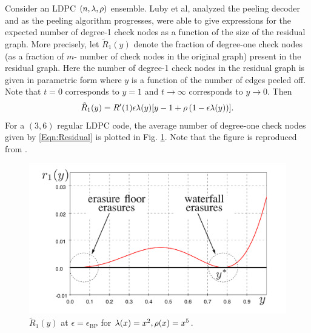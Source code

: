 Consider an LDPC  $(n,\lambda,\rho)$ ensemble. Luby et al, analyzed the peeling decoder and as  the peeling algorithm progresses, were able to give expressions for the expected number of degree-1 check nodes as a function of the size of the residual graph. More precisely, let $\tilde{R}_{1}(y)$ denote the fraction of degree-one check nodes (as a fraction of $m$- number of check nodes in the original graph) present in the residual graph. Here the number of degree-1 check nodes in the residual graph is given in parametric form where $y$ is a function of the number of edges peeled off. Note that $t=0$ corresponds to $y=1$ and $t\rightarrow \infty$ corresponds to $y\rightarrow 0$. Then
\begin{align}
\tilde{R}_{1}(y)=R'(1)\epsilon\lambda(y)[y-1+\rho\left(1-\epsilon\lambda(y)\right) ].
\label{Eqn:Residual}
\end{align}
For a $(3,6)$ regular LDPC code, the average number of degree-one check nodes given by \eqref{Eqn:Residual} is plotted in Fig. \ref{Fig:LDPCResidual}. Note that the figure is reproduced from \cite{amraoui2007find}.

\begin{figure}[b]
\centering
\includegraphics[width=0.95\columnwidth]{data/UMAC/Figures/small_large_Erasures.png}
\caption{$\tilde{R}_{1}(y)$ at $\epsilon=\epsilon_{\text{BP}}$ for $\lambda(x)=x^2,\rho(x)=x^5$.}
\label{Fig:LDPCResidual}
\end{figure}

